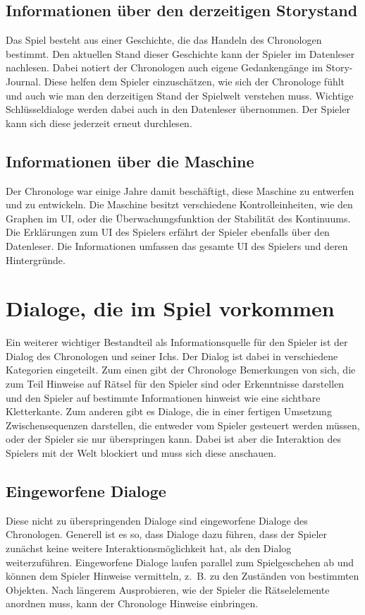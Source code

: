 \subsection{Informationen über den derzeitigen Storystand}
Das Spiel besteht aus einer Geschichte, die das Handeln des Chronologen bestimmt. Den aktuellen Stand dieser Geschichte kann der Spieler im Datenleser nachlesen. Dabei notiert der Chronologen auch eigene Gedankengänge im Story-Journal. Diese helfen dem Spieler einzuschätzen, wie sich der Chronologe fühlt und auch wie man den derzeitigen Stand der Spielwelt verstehen muss. Wichtige Schlüsseldialoge werden dabei auch in den Datenleser übernommen. Der Spieler kann sich diese jederzeit erneut durchlesen.

\subsection{Informationen über die Maschine}
Der Chronologe war einige Jahre damit beschäftigt, diese Maschine zu entwerfen und zu entwickeln. Die Maschine besitzt verschiedene Kontrolleinheiten, wie den Graphen im \ac{UI}, oder die Überwachungsfunktion der Stabilität des Kontinuums. Die Erklärungen zum \ac{UI} des Spielers erfährt der Spieler ebenfalls über den Datenleser. Die Informationen umfassen das gesamte \ac{UI} des Spielers und deren Hintergründe.

\section{Dialoge, die im Spiel vorkommen}
Ein weiterer wichtiger Bestandteil als Informationsquelle für den Spieler ist der Dialog des Chronologen und seiner Ichs. Der Dialog ist dabei in verschiedene Kategorien eingeteilt.
Zum einen gibt der Chronologe Bemerkungen von sich, die zum Teil Hinweise auf Rätsel für den Spieler sind oder Erkenntnisse darstellen und den Spieler auf bestimmte Informationen hinweist wie eine sichtbare Kletterkante.
Zum anderen gibt es Dialoge, die in einer fertigen Umsetzung Zwischensequenzen darstellen, die entweder vom Spieler gesteuert werden müssen, oder der Spieler sie nur überspringen kann. Dabei ist aber die Interaktion des Spielers mit der Welt blockiert und muss sich diese anschauen.

\subsection{Eingeworfene Dialoge}\label{sec:throw-in-dialogues}
Diese nicht zu überspringenden Dialoge sind eingeworfene Dialoge des Chronologen. Generell ist es so, dass Dialoge dazu führen, dass der Spieler zunächst keine weitere Interaktionsmöglichkeit hat, als den Dialog weiterzuführen. Eingeworfene Dialoge laufen parallel zum Spielgeschehen ab und können dem Spieler Hinweise vermitteln, z. B. zu den Zuständen von bestimmten Objekten. Nach längerem Ausprobieren, wie der Spieler die Rätselelemente anordnen muss, kann der Chronologe Hinweise einbringen.

